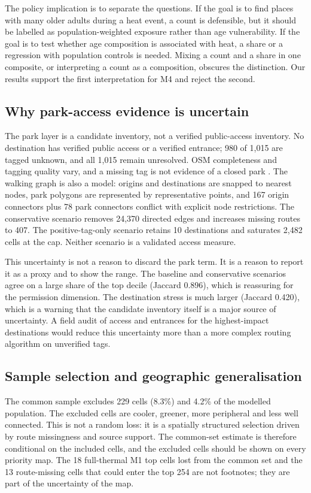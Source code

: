 \documentclass[times,twoside]{_Templates/MultiTargetManuscript}
\begin{document}
The policy implication is to separate the questions. If the goal is to find
places with many older adults during a heat event, a count is defensible, but it
should be labelled as population-weighted exposure rather than age vulnerability.
If the goal is to test whether age composition is associated with heat, a share
or a regression with population controls is needed. Mixing a count and a share in
one composite, or interpreting a count as a composition, obscures the
distinction. Our results support the first interpretation for M4 and reject the
second.

\subsection{Why park-access evidence is uncertain}

The park layer is a candidate inventory, not a verified public-access inventory.
No destination has verified public access or a verified entrance; 980 of 1,015
are tagged unknown, and all 1,015 remain unresolved. OSM completeness and
tagging quality vary, and a missing tag is not evidence of a closed park
\citep{haklay2010,barron2014,herfort2023}. The walking graph is also a model:
origins and destinations are snapped to nearest nodes, park polygons are
represented by representative points, and 167 origin connectors plus 78 park
connectors conflict with explicit node restrictions. The conservative scenario
removes 24,370 directed edges and increases missing routes to 407. The
positive-tag-only scenario retains 10 destinations and saturates 2,482 cells at
the cap. Neither scenario is a validated access measure.

This uncertainty is not a reason to discard the park term. It is a reason to
report it as a proxy and to show the range. The baseline and conservative
scenarios agree on a large share of the top decile (Jaccard 0.896), which is
reassuring for the permission dimension. The destination stress is much larger
(Jaccard 0.420), which is a warning that the candidate inventory itself is a
major source of uncertainty. A field audit of access and entrances for the
highest-impact destinations would reduce this uncertainty more than a more
complex routing algorithm on unverified tags.

\subsection{Sample selection and geographic generalisation}

The common sample excludes 229 cells (8.3\%) and 4.2\% of the modelled
population. The excluded cells are cooler, greener, more peripheral and less
well connected. This is not a random loss: it is a spatially structured
selection driven by route missingness and source support. The common-set
estimate is therefore conditional on the included cells, and the excluded cells
should be shown on every priority map. The 18 full-thermal M1 top cells lost from
the common set and the 13 route-missing cells that could enter the top 254 are
not footnotes; they are part of the uncertainty of the map.
\end{document}
